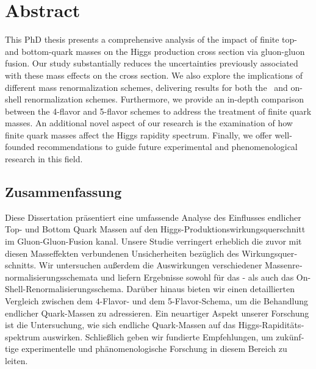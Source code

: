 \begingroup
\let\clearpage\relax
\let\cleardoublepage\relax
\let\cleardoublepage\relax
\chapter*{Abstract}

This PhD thesis presents a comprehensive analysis of the impact of finite top- and bottom-quark masses on the Higgs production cross section via gluon-gluon fusion. Our study substantially reduces the uncertainties previously associated with these mass effects on the cross section. We also explore the implications of different mass renormalization schemes, delivering results for both the \MS\ and on-shell renormalization schemes. Furthermore, we provide an in-depth comparison between the 4-flavor and 5-flavor schemes to address the treatment of finite quark masses. An additional novel aspect of our research is the examination of how finite quark masses affect the Higgs rapidity spectrum. Finally, we offer well-founded recommendations to guide future experimental and phenomenological research in this field.

\newpage
\begin{otherlanguage}{ngerman}
\chapter*{Zusammenfassung}
Diese Dissertation präsentiert eine umfassende Analyse des Einflusses endlicher Top- und Bottom Quark Massen auf den Higgs-Produktionswirkungsquerschnitt im Gluon-Gluon-Fusion kanal. Unsere Studie verringert erheblich die zuvor mit diesen Masseffekten verbundenen Unsicherheiten bezüglich des Wirkungsquerschnitts. Wir untersuchen außerdem die Auswirkungen verschiedener Massenrenormalisierungsschemata und liefern Ergebnisse sowohl für das \MS- als auch das On-Shell-Renormalisierungsschema. Darüber hinaus bieten wir einen detaillierten Vergleich zwischen dem 4-Flavor- und dem 5-Flavor-Schema, um die Behandlung endlicher Quark-Massen zu adressieren. Ein neuartiger Aspekt unserer Forschung ist die Untersuchung, wie sich endliche Quark-Massen auf das Higgs-Rapiditätsspektrum auswirken. Schließlich geben wir fundierte Empfehlungen, um zukünftige experimentelle und phänomenologische Forschung in diesem Bereich zu leiten.

\end{otherlanguage}

\endgroup

\vfill
